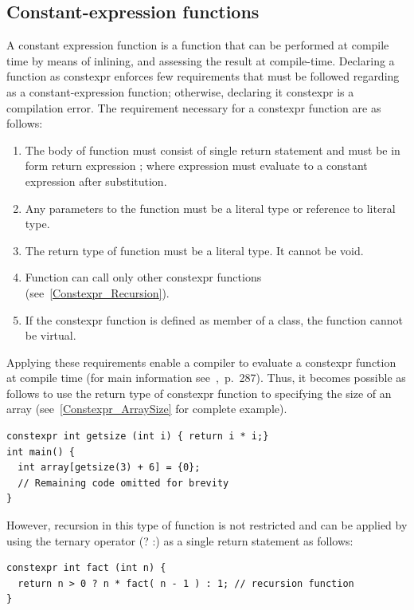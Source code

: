 \documentclass[11pt]{report}
\begin{document}
\subsection{Constant-expression functions}
\label{Constant Expression Functions}
A constant expression function is a function that can be performed at compile time by means of inlining, and assessing the result at compile-time. Declaring a function as constexpr enforces few requirements that must be followed regarding as a constant-expression function; otherwise, declaring it constexpr is a compilation error. The requirement necessary for a constexpr function are as follows:

\begin{enumerate}
\item The body of function must consist of single return statement and must be in form {return expression ;} where expression must evaluate to a constant expression after substitution.

\item Any parameters to the function must be a literal type or reference to literal type.

\item The return type of function must be a literal type. It cannot be void.

\item Function can call only other constexpr functions (see~\ref{Constexpr_Recursion}).

\item If the constexpr function is defined as member of a class, the function cannot be virtual.
\end{enumerate}
Applying these requirements enable a compiler to evaluate a constexpr function at compile time (for main information see~\cite{Gregorie:professionalcpp},~p.~287). Thus, it becomes possible as follows to use the return type of constexpr function to specifying the size of an array (see~\ref{Constexpr_ArraySize} for complete example).
\begin{lstlisting}
constexpr int getsize (int i) { return i * i;}
int main() {
  int array[getsize(3) + 6] = {0};
  // Remaining code omitted for brevity
}
\end{lstlisting}
However, recursion in this type of function is not restricted and can be applied by using the ternary operator (? :) as a single return statement as follows:
\begin{lstlisting}
constexpr int fact (int n) {
  return n > 0 ? n * fact( n - 1 ) : 1; // recursion function
}
\end{lstlisting}
\end{document}
